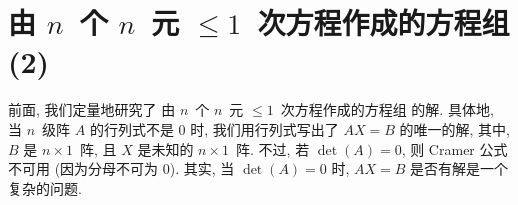 \documentclass[../libro.tex]{subfiles}
\begin{document}

\KunAsteriskoEnEnhavtabelo
\section{\texorpdfstring{由 \(n\)~个 \(n\)~元
    \({\leq} 1\)~次方程作成的方程组 (2)}%
{由 n 个 n 元 ≤1 次方程作成的方程组 (2)}}
\SenAsteriskoEnEnhavtabelo

\maldevigalegajxo

前面, 我们定量地研究了%
由 \(n\)~个 \(n\)~元 \({\leq} 1\)~次方程作成的方程组%
的解.
具体地, 当 \(n\)~级阵 \(A\) 的行列式不是 \(0\) 时,
我们用行列式写出了 \(AX = B\) 的唯一的解,
其中,
\(B\) 是 \(n \times 1\)~阵,
且 \(X\) 是未知的 \(n \times 1\)~阵.
不过, 若 \(\det {(A)} = 0\),
则 Cramer 公式不可用
(因为分母不可为 \(0\)).
其实, 当 \(\det {(A)} = 0\) 时,
\(AX = B\) 是否有解是一个复杂的问题.
\end{document}
